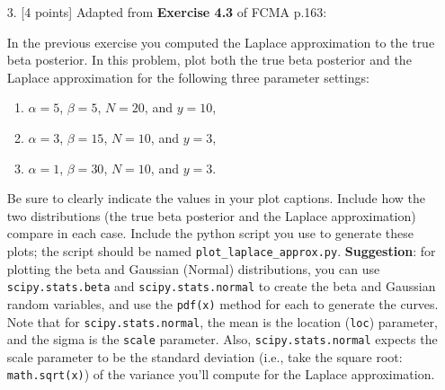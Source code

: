 \documentclass[10pt]{article}
\begin{document}
\begin{itemize}
In Chapter 3, we computed the posterior density over $r$, the probability of a coin giving heads, using a beta prior and a binomial likelihood.  Recalling that the beta prior, with parameters $\alpha$ and $\beta$, is given by
\begin{eqnarray*}
p(r | \alpha, \beta) = \frac{\Gamma(\alpha + \beta)}{\Gamma(\alpha) \Gamma(\beta)} r^{\alpha - 1} (1 - r)^{\beta - 1}
\end{eqnarray*}
and the binomial likelihood, assuming $y$ heads in $N$ throws, is given by
\begin{eqnarray*}
p(y | r, N) = {N \choose y} r^{y} (1 - r)^{N-y} ~,
\end{eqnarray*}
{\bf compute the Laplace approximation to the posterior}.  (Note, you should be able to obtain a closed-form solution for the MAP value, $\hat{r}$, by getting the log posterior, differentiating (with respect to $r$), equating to zero and solving for $r$.)

{\bf Solution.}




\item[3.]  [4 points]
Adapted from {\bf Exercise 4.3} of FCMA p.163:

In the previous exercise you computed the Laplace approximation to the true beta posterior.  In this problem, plot both the true beta posterior and the Laplace approximation for the following three parameter settings:
\begin{enumerate}
\item $\alpha = 5$, $\beta = 5$, $N = 20$, and $y = 10$,
\item $\alpha = 3$, $\beta = 15$, $N = 10$, and $y = 3$,
\item $\alpha = 1$, $\beta = 30$, $N = 10$, and $y = 3$.
\end{enumerate}
Be sure to clearly indicate the values in your plot captions.  Include how the two distributions (the true beta posterior and the Laplace approximation) compare in each case.  Include the python script you use to generate these plots; the script should be named {\tt plot\_laplace\_approx.py}.  {\bf Suggestion}: for plotting the beta and Gaussian (Normal) distributions, you can use {\tt scipy.stats.beta} and {\tt scipy.stats.normal} to create the beta and Gaussian random variables, and use the {\tt pdf(x)} method for each to generate the curves.  Note that for {\tt scipy.stats.normal}, the mean is the location ({\tt loc}) parameter, and the sigma is the {\tt scale} parameter.  Also, {\tt scipy.stats.normal} expects the scale parameter to be the standard deviation (i.e., take the square root: {\tt math.sqrt(x)}) of the variance you'll compute for the Laplace approximation.



\end{itemize}
\end{document}
